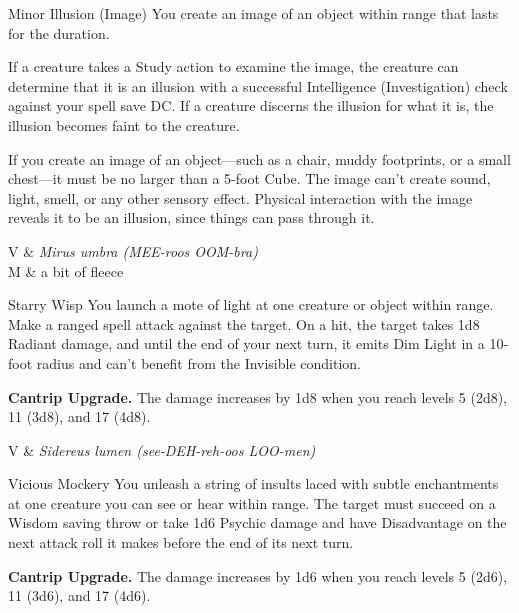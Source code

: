 \begin{Spell}[
    level=Cantrip,
    time=1 Action,
    range=30 ft. / 5 ft.,
    components={S, M},
    duration=1 Minute,
    school=Illusion,
    attack=None,
    effect=Control
]{Minor Illusion (Image)}
You create an image of an object within range that lasts for the duration.

If a creature takes a Study action to examine the image, the creature can determine that it is an illusion with a successful Intelligence (Investigation) check against your spell save DC. If a creature discerns the illusion for what it is, the illusion becomes faint to the creature.

If you create an image of an object—such as a chair, muddy footprints, or a small chest—it must be no larger than a 5-foot Cube. The image can't create sound, light, smell, or any other sensory effect. Physical interaction with the image reveals it to be an illusion, since things can pass through it.

\begin{components}
V & \textit{Mirus umbra (MEE-roos OOM-bra)} \\
M & a bit of fleece
\end{components}
\end{Spell}


\begin{Spell}[
    level=Cantrip,
    time=1 Action,
    range=60 ft.,
    components={V, S},
    duration=Instantaneous,
    school=Evocation,
    attack=Ranged,
    effect=Radiant
]{Starry Wisp}
You launch a mote of light at one creature or object within range. Make a ranged spell attack against the target. On a hit, the target takes 1d8 Radiant damage, and until the end of your next turn, it emits Dim Light in a 10-foot radius and can't benefit from the Invisible condition.

\textbf{Cantrip Upgrade.} The damage increases by 1d8 when you reach levels 5 (2d8), 11 (3d8), and 17 (4d8).
\begin{components}
V & \textit{Sidereus lumen (see-DEH-reh-oos LOO-men)}
\end{components}
\end{Spell}


\begin{Spell}[
    level=Cantrip,
    time=1 Action,
    range=60 ft.,
    components={V},
    duration=Instantaneous,
    school=Enchantment,
    attack=WIS Save,
    effect=Psychic
]{Vicious Mockery}
You unleash a string of insults laced with subtle enchantments at one creature you can see or hear within range. The target must succeed on a Wisdom saving throw or take 1d6 Psychic damage and have Disadvantage on the next attack roll it makes before the end of its next turn.

\textbf{Cantrip Upgrade.} The damage increases by 1d6 when you reach levels 5 (2d6), 11 (3d6), and 17 (4d6).
\end{Spell}


